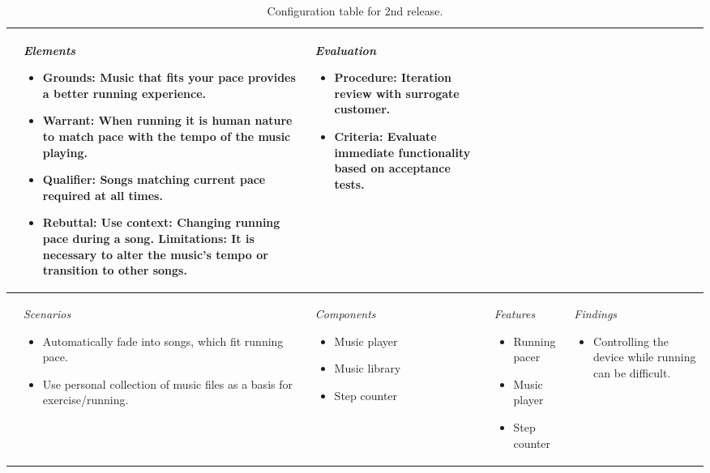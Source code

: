 \begin{table}
\begin{tabular}{|l|l|l|l|l|}
{	}
	& \parbox[t][][c]{0.20\textwidth}{
		\textit{Elements}
		\begin{itemize}[leftmargin=*] 
		\item Grounds: 
		Music that fits your pace provides a better running experience. 
		\item Warrant: 
		When running it is human nature to match pace with the tempo of the music playing. 
		\item Qualifier:
		Songs matching current pace required at all times.
		\item Rebuttal: \newline
		Use context: \newline
		Changing running pace during a song. \newline 
		Limitations: 
		It is necessary to alter the music's tempo or transition to other songs.
		\end{itemize}
	}
	& \parbox[t][][c]{0.20\textwidth}{ 
		\textit{Evaluation}
		\begin{itemize}[leftmargin=*]
		\item Procedure:  Iteration review with surrogate customer.
		\item Criteria:  Evaluate immediate functionality based on acceptance tests.
		\end{itemize}		
	}\\ \hline
\parbox[t][3.5cm][c]{0.02\textwidth}{}
	& \parbox[t][][c]{0.20\textwidth}{ 
		\textit{Scenarios}
		\begin{itemize}[leftmargin=*]
		\item Automatically fade into songs, which fit running pace.
		\item Use personal collection of music files as a basis for exercise/running.
		\end{itemize}
	}
	& \parbox[t][][c]{0.20\textwidth}{ 
		\textit{Components}
		\begin{itemize}[leftmargin=*]
		\item Music player
		\item Music library
		\item Step counter
		\end{itemize}
	}
	& \parbox[t][][c]{0.20\textwidth}{ 
		\textit{Features}
		\begin{itemize}[leftmargin=*]
		\item Running pacer
		\item Music player
		\item Step counter
		\end{itemize}
	}
	& \parbox[t][][c]{0.20\textwidth}{ 
		\textit{Findings} 
		\begin{itemize}[leftmargin=*]
		\item Controlling the device while running can be difficult.
		\end{itemize}
	}\\ \hline     
\end{tabular}
\caption[Table caption text]{Configuration table for 2nd release.}
\label{table:config1}
\end{table}